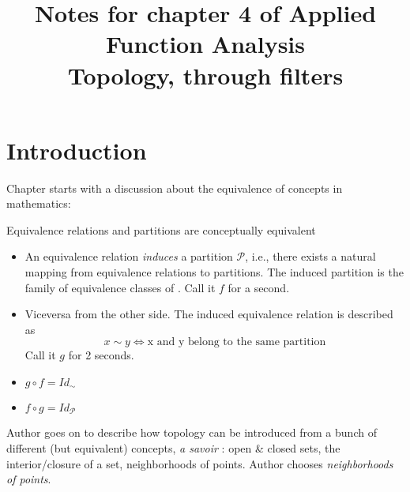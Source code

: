 \title{\large Notes for chapter 4 of Applied Function Analysis\\\huge Topology, through filters}
\date{\vspace{-5ex}}


\maketitle
\tableofcontents
\pagebreak
\section*{Introduction}\label{sec:intro}
Chapter starts with a discussion about the equivalence of concepts in mathematics:
\begin{myeg}{Equivalence relations and partitions are conceptually equivalent}
	\begin{itemize}
		\item An equivalence relation \tilde{} \textit{induces} a partition $\mathcal{P}$, i.e., there exists a natural mapping from equivalence relations to partitions. The induced partition is the family of equivalence classes of \tilde{}. Call it $f$ for a second.
		\item Viceversa from the other side. The induced equivalence relation is described as
			$$x\sim y \iff \textrm{x and y belong to the same partition} $$
		Call it $g$ for 2 seconds.
		\item $g\circ f = Id_\sim$
		\item $f\circ g = Id_{\mathcal{P}}$
	\end{itemize}
\end{myeg}

Author goes on to describe how topology can be introduced from a bunch of different (but equivalent) concepts, \textit{a savoir} : open \& closed sets, the interior/closure of a set, neighborhoods of points. Author chooses \textit{neighborhoods of points}.\par
\pagebreak
